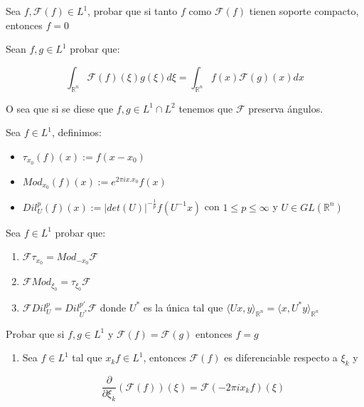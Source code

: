 \documentclass[11pt]{article}
\newcommand{\R}{{\mathbb{R}}}
\newenvironment{definition}[1][Definici\'on]{\begin{trivlist}
\item[\hskip \labelsep {\bfseries #1}]}{\end{trivlist}}
\newcommand{\F}{\mathcal{F}}
\begin{document}
\begin{enumerate}
\item Sea $f,\F(f) \in L^1$, probar que si tanto $f$ como $\F(f)$ tienen soporte compacto, entonces $f=0$

\item Sean $f,g \in L^1$ probar que:

$$\int_{\R^n}{\F(f)(\xi){g}(\xi)d\xi} = \int_{\R^n}{f(x)\F(g)(x)dx}$$

O sea que si se diese que $f,g \in L^1 \cap L^2$ tenemos que $\F$ preserva \'angulos.

\begin{definition}
Sea $f \in L^1$, definimos:

\begin{itemize}

\item $\tau_{x_0}(f)(x):=f(x-x_0)$
\item $\mathit{Mod}_{x_0}(f)(x) := e^{2\pi i x.x_0}f(x)$
\item $\mathit{Dil}_{U}^{p}(f)(x) := |det(U)|^{-\frac{1}{p}}f(U^{-1}x)$ con $1\leq p\leq\infty$ y $U \in GL(\R^n)$

\end{itemize}

\end{definition}

\item Sea $f \in L^1$ probar que:

\begin{enumerate}

\item $\F\tau_{x_0} = \mathit{Mod}_{-x_0}\F$
\item $\F \mathit{Mod_{\xi_0}} = \tau_{\xi_0}\F$
\item $\F\mathit{Dil}_{U}^{p} = \mathit{Dil}_{U^*}^{p'}\F$ donde $U^*$ es la \'unica tal que $\langle Ux , y \rangle_{\R^n} = \langle x , U^*y \rangle_{\R^n}$


\end{enumerate}

\item Probar que si $f,g \in L^1$ y $\F(f) = \F(g)$ entonces $f=g$

\item 

\begin{enumerate}

\item Sea $f \in L^1$ tal que $x_kf \in L^1$, entonces $\F(f)$ es diferenciable respecto a $\xi_k$ y 

$$\dfrac{\partial}{\partial \xi_k} \left( \F(f) \right) (\xi) = \F(-2 \pi i x_k f)(\xi)$$ 


\end{enumerate}
\end{enumerate}
\end{document}
